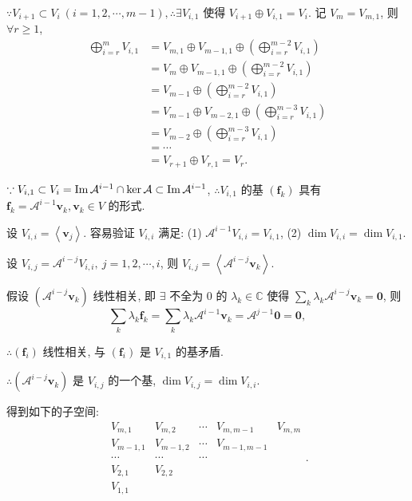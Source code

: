 \documentclass{ctexart}
\begin{document}
$\because V_{i+1}\subset V_i\ (i=1,2,\cdots,m-1),\therefore\exists V_{i,1}$ 使得 $V_{i+1}\oplus V_{i,1}=V_i$. 记 $V_m=V_{m,1}$, 则 $\forall r\geq1$,
\begin{equation}\label{eq4.7}
    \begin{aligned}
        \bigoplus\limits_{i=r}^mV_{i,1} & =V_{m,1}\oplus V_{m-1,1}\oplus\left(\bigoplus\limits_{i=r}^{m-2}V_{i,1}\right) \\
        & =V_m\oplus V_{m-1,1}\oplus\left(\bigoplus\limits_{i=r}^{m-2}V_{i,1}\right) \\
        & =V_{m-1}\oplus\left(\bigoplus\limits_{i=r}^{m-2}V_{i,1}\right) \\
        & =V_{m-1}\oplus V_{m-2,1}\oplus\left(\bigoplus\limits_{i=r}^{m-3}V_{i,1}\right) \\
        & =V_{m-2}\oplus\left(\bigoplus\limits_{i=r}^{m-3}V_{i,1}\right) \\
        & =\cdots \\
        & =V_{r+1}\oplus V_{r,1}=V_r.
    \end{aligned}
\end{equation}

$\because V_{i,1}\subset V_i=\operatorname{Im} \mathcal{A}^{i-1}\cap\ker\mathcal{A}\subset\operatorname{Im} \mathcal{A}^{i-1}$, $\therefore V_{i,1}$ 的基 $(\boldsymbol{f}_k)$ 具有 $\boldsymbol{f}_k=\mathcal{A}^{i-1}\boldsymbol{v}_k,\boldsymbol{v}_k\in V$ 的形式.

设 $V_{i,i}=\left<\boldsymbol{v}_j\right>$. 容易验证 $V_{i,i}$ 满足: (1) $\mathcal{A}^{i-1}V_{i,i}=V_{i,1}$, (2) $\dim V_{i,i}=\dim V_{i,1}$.

设 $V_{i,j}=\mathcal{A}^{i-j}V_{i,i},\ j=1,2,\cdots,i$, 则 $V_{i,j}=\left<\mathcal{A}^{i-j}\boldsymbol{v}_k\right>$.

假设 $(\mathcal{A}^{i-j}\boldsymbol{v}_k)$ 线性相关, 即 $\exists$ 不全为 $0$ 的 $\lambda_k\in\mathbb{C}$ 使得 $\sum\limits_k\lambda_k\mathcal{A}^{i-j}\boldsymbol{v}_k=\boldsymbol{0}$, 则
\[\sum\limits_k\lambda_k\boldsymbol{f}_k=\sum\limits_k\lambda_k\mathcal{A}^{i-1}\boldsymbol{v}_k=\mathcal{A}^{j-1}\boldsymbol{0}=\boldsymbol{0},\]

$\therefore(\boldsymbol{f}_i)$ 线性相关, 与 $(\boldsymbol{f}_i)$ 是 $V_{i,1}$ 的基矛盾.

$\therefore(\mathcal{A}^{i-j}\boldsymbol{v}_k)$ 是 $V_{i,j}$ 的一个基, $\dim V_{i,j}=\dim V_{i,i}$.

得到如下的子空间:
\begin{equation}\label{eq4.8}
    \begin{matrix}
        V_{m,1} & V_{m,2} & \cdots & V_{m,m-1} & V_{m,m} \\
        V_{m-1,1} & V_{m-1,2} & \cdots & V_{m-1,m-1} \\
        \cdots & \cdots & \cdots \\
        V_{2,1} & V_{2,2} \\
        V_{1,1}
    \end{matrix}.
\end{equation}
\end{document}
